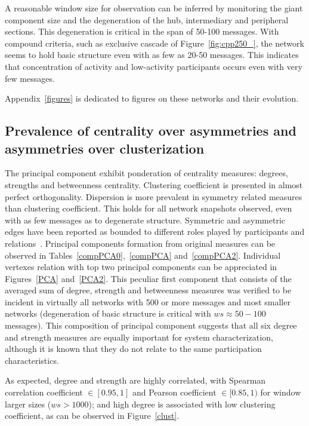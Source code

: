 \documentclass[%
 aip,
 jmp,%
 amsmath,amssymb,
 reprint,%
]{revtex4-1}
\begin{document}
A reasonable window size for observation can be inferred by monitoring the giant component size and the degeneration of the hub, intermediary and peripheral sections. This degeneration is critical in the span of 50-100 messages. With compound criteria, such as exclusive cascade of Figure~\ref{fig:cpp250_}, the network seems to hold basic structure even with as few as 20-50 messages. This indicates that concentration of activity and low-activity participants occurs even with very few messages.

Appendix~\ref{figures} is dedicated to figures on these networks and their evolution.


    \subsection{Prevalence of centrality over asymmetries and asymmetries over clusterization}\label{prevalence}

The principal component exhibit ponderation of centrality measures: degrees, strengths and betweenness centrality. Clustering coefficient is presented in almost perfect orthogonality. Dispersion is more prevalent in symmetry related measures than clustering coefficient. This holds for all network snapshots observed, even with as few messages as to degenerate structure. Symmetric and asymmetric edges have been reported as bounded to different roles played by participants and relations~\cite{newmanEvolving}. Principal components formation from original measures can be observed in Tables~\ref{compPCA0},~\ref{compPCA} and~\ref{compPCA2}. Individual vertexes relation with top two principal components can be appreciated in Figures~\ref{PCA} and~\ref{PCA2}.
This peculiar first component that consists of the averaged sum of degree, strength and betweenness measures was verified to be incident in virtually all networks with 500 or more messages and most smaller networks (degeneration of basic structure is critical with $ws \approx 50-100$ messages). This composition of principal component suggests that all six degree and strength measures are equally important for system characterization, although it is known that they do not relate to the same participation characteristics.

As expected, degree and strength are highly correlated, with Spearman correlation coefficient $\in [0.95,1]$ and Pearson coefficient $\in [0.85,1)$ for window larger sizes ($ws>1000$); and high degree is associated with low clustering coefficient, as can be observed in Figure~\ref{clust}.
\end{document}
